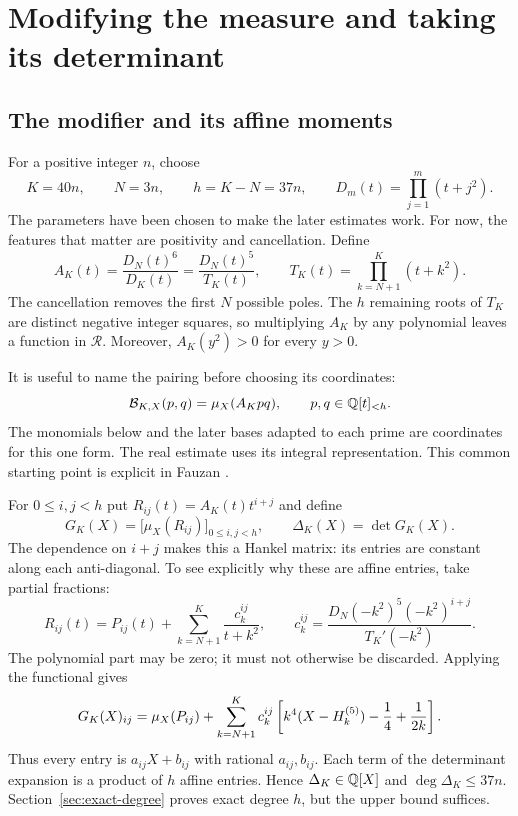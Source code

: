 
\section[Modifying the measure and its determinant]{Modifying the measure and taking its determinant}\label{sec:determinant}
\subsection{The modifier and its affine moments}
For a positive integer $n$, choose
\[
 K=40n,\qquad N=3n,\qquad h=K-N=37n,
 \qquad D_m(t)=\prod_{j=1}^m(t+j^2).
\]
The parameters have been chosen to make the later estimates work.
For now, the features that matter are positivity and cancellation. Define
\[
 A_K(t)=\frac{D_N(t)^6}{D_K(t)}
       =\frac{D_N(t)^5}{T_K(t)},\qquad
 T_K(t)=\prod_{k=N+1}^K(t+k^2).
\]
The cancellation removes the first $N$ possible poles. The $h$ remaining
roots of $T_K$ are distinct negative integer squares, so multiplying
$A_K$ by any polynomial leaves a function in $\mathcal R$.
Moreover, $A_K(y^2)>0$ for every $y>0$.

It is useful to name the pairing before choosing its coordinates:
\begin{equation}\label{eq:bilinear-form}
 \mathcal B_{K,X}(p,q)=\mu_X(A_Kpq),
 \qquad p,q\in\mathbb Q[t]_{<h}.
\end{equation}
The monomials below and the later bases adapted to each prime are
coordinates for this one form. The real estimate uses its integral
representation. This common starting point is explicit in
Fauzan \cite[Sections 2.3--2.4]{fauzan}.

For $0\leq i,j<h$ put $R_{ij}(t)=A_K(t)t^{i+j}$ and define
\begin{equation}\label{eq:G}
 G_K(X)=\bigl[\mu_X(R_{ij})\bigr]_{0\leq i,j<h},
 \qquad \Delta_K(X)=\det G_K(X).
\end{equation}
The dependence on $i+j$ makes this a Hankel matrix: its entries are constant
along each anti-diagonal.
To see explicitly why these are affine entries, take partial fractions:
\[
 R_{ij}(t)=P_{ij}(t)+\sum_{k=N+1}^K\frac{c_k^{ij}}{t+k^2},
 \qquad
 c_k^{ij}=\frac{D_N(-k^2)^5(-k^2)^{i+j}}{T_K'(-k^2)}.
\]
The polynomial part may be zero; it must not otherwise be discarded.
Applying the functional gives
\[
 G_K(X)_{ij}=\mu_X(P_{ij})+
 \sum_{k=N+1}^K c_k^{ij}
 \left[k^4(X-H_{k}^{(5)})-\frac14+\frac1{2k}\right].
\]
Thus every entry is $a_{ij}X+b_{ij}$ with rational $a_{ij},b_{ij}$.
Each term of the determinant expansion is a product of \(h\) affine
entries. Hence $\Delta_K\in\mathbb Q[X]$ and $\deg\Delta_K\leq37n$.
Section~\ref{sec:exact-degree} proves exact degree $h$, but the upper bound suffices.

